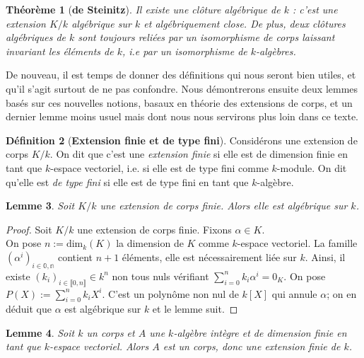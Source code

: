 \documentclass[10pt, twoside]{article}
\theoremstyle{plain}
\newtheorem{theorem}{Théorème}[section]
\theoremstyle{definition}
\newtheorem{definition}[theorem]{Définition}
\theoremstyle{plain}
\theoremstyle{plain}
\newtheorem{lemma}[theorem]{Lemme}
\theoremstyle{definition}
\theoremstyle{remark}
\begin{document}
\begin{theorem}[\textbf{de Steinitz}]\label{thm:Steinitz}
    Il existe une clôture algébrique de $k$ : c'est une extension $K/k$ algébrique sur $k$ et algébriquement close. De plus, deux clôtures algébriques de $k$ sont toujours reliées par un isomorphisme de corps laissant invariant les éléments de $k$, i.e par un isomorphisme de $k$-algèbres.
\end{theorem}

De nouveau, il est temps de donner des définitions qui nous seront bien utiles, et qu'il s'agit surtout de ne pas confondre. Nous démontrerons ensuite deux lemmes basés sur ces nouvelles notions, basaux en théorie des extensions de corps, et un dernier lemme moins usuel mais dont nous nous servirons plus loin dans ce texte.

\begin{definition}[\textbf{Extension finie et de type fini}]\label{def:extension tf}
    Considérons une extension de corps $K/k$. On dit que c'est une \textit{extension finie} si elle est de dimension finie en tant que $k$-espace vectoriel, i.e. si elle est de type fini comme $k$-module. 
    On dit qu'elle est \textit{de type fini} si elle est de type fini en tant que $k$-algèbre.
\end{definition}

\begin{lemma}\label{lem:ext finie alg}
    Soit $K/k$ une extension de corps finie. Alors elle est algébrique sur $k$. 
\end{lemma}

\begin{proof}
    Soit $K/k$ une extension de corps finie. Fixons $\alpha \in K$.\\
    On pose $n := \text{dim}_k(K)$ la dimension de $K$ comme $k$-espace vectoriel. La famille $(\alpha^i)_{i \in \mathbb{0, n}}$ contient $n+1$ éléments, elle est nécessairement liée sur $k$. Ainsi, il existe $(k_i)_{i \in \llbracket 0, n \rrbracket} \in k^n$ non tous nuls vérifiant $\sum\limits_{i=0}^{n} k_i \alpha^i = 0_K$. On pose $P(X) := \sum\limits_{i=0}^{n} k_i X^i$. C'est un polynôme non nul de $k[X]$ qui annule $\alpha$; on en déduit que $\alpha$ est algébrique sur $k$ et le lemme suit.
\end{proof}

\begin{lemma}\label{lem:alg corps}
    Soit $k$ un corps et $A$ une $k$-algèbre intègre et de dimension finie en tant que $k$-espace vectoriel. Alors $A$ est un corps, donc une extension finie de $k$. 
\end{lemma}
\end{document}
